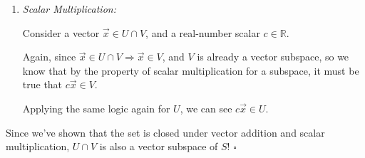 {\begin{enumerate}
{        %
        }
        \item{\textit{Scalar Multiplication:} 

        Consider a vector $\vec{x} \in U \cap V$, and a real-number scalar $c \in \mathbb{R}$.

        Again, since $\vec{x} \in U \cap V \Longrightarrow \vec{x} \in V$, and $V$ is already a vector subspace, so we know that by the property of scalar multiplication for a subspace, it must be true that $c\vec{x} \in V$.

        Applying the same logic again for $U$, we can see $c\vec{x} \in U$.
        }
    \end{enumerate}
    Since we've shown that the set is closed under vector addition and scalar multiplication, $U \cap V$ is also a vector subspace of $S$!  $\square$
}